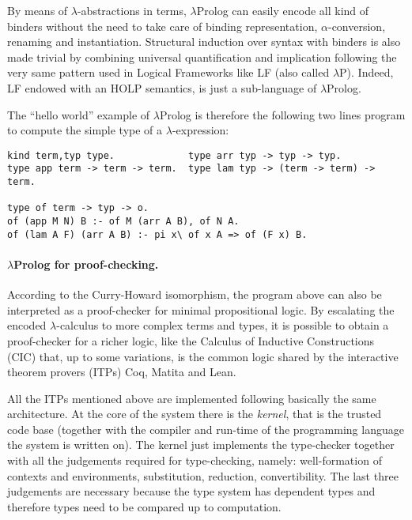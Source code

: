 \documentclass{easychair}
\begin{document}
By means of $\lambda$-abstractions in terms, $\lambda$Prolog can
easily encode all kind of binders without the need to take care of
binding representation, $\alpha$-conversion, renaming and
instantiation. Structural induction over syntax with binders is also
made trivial by combining universal quantification and implication
following the very same pattern used in Logical Frameworks like LF
(also called $\lambda$P). Indeed, LF endowed with an HOLP semantics,
is just a sub-language of
$\lambda$Prolog.

The ``hello world'' example of $\lambda$Prolog is therefore the
following two lines program to compute the simple type of a
$\lambda$-expression:

\begin{Verbatim}
kind term,typ type.             type arr typ -> typ -> typ.
type app term -> term -> term.  type lam typ -> (term -> term) -> term.

type of term -> typ -> o.
of (app M N) B :- of M (arr A B), of N A.
of (lam A F) (arr A B) :- pi x\ of x A => of (F x) B.
\end{Verbatim}

\paragraph{$\lambda$Prolog for proof-checking.}

According to the Curry-Howard isomorphism, the program above can also
be interpreted as a proof-checker for minimal propositional logic. By
escalating the encoded $\lambda$-calculus to more complex terms and
types, it is possible to obtain a proof-checker for a richer
logic, like the Calculus of Inductive Constructions (CIC) that, up to some
variations, is the common logic shared by the interactive theorem
provers (ITPs) Coq, Matita and Lean. %

All the ITPs mentioned above are implemented following
basically the same architecture. At the core of the system there is
the \emph{kernel}, that is the trusted code base (together with the
compiler and run-time of the programming language the system is
written on). The kernel just implements the type-checker together with
all the judgements required for type-checking, namely: well-formation
of contexts and environments, substitution, reduction, convertibility.
The last three judgements are necessary because the type system has
dependent types and therefore types need to be compared up to
computation.
\end{document}
